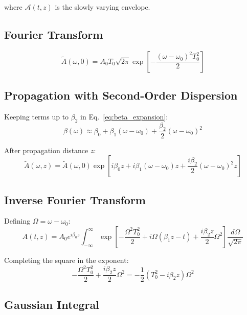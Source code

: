 \documentclass[12pt,a4paper]{article}
\begin{document}
where $\mathcal{A}(t, z)$ is the slowly varying envelope.

\subsection{Fourier Transform}

\begin{equation}
\tilde{A}(\omega, 0) = A_0 T_0 \sqrt{2\pi} \exp\left[-\frac{(\omega - \omega_0)^2 T_0^2}{2}\right]
\end{equation}

\subsection{Propagation with Second-Order Dispersion}

Keeping terms up to $\beta_2$ in Eq.~\eqref{eq:beta_expansion}:
\begin{equation}
\beta(\omega) \approx \beta_0 + \beta_1(\omega - \omega_0) + \frac{\beta_2}{2}(\omega - \omega_0)^2
\end{equation}

After propagation distance $z$:
\begin{equation}
\tilde{A}(\omega, z) = \tilde{A}(\omega, 0) \exp\left[i\beta_0 z + i\beta_1(\omega - \omega_0)z + \frac{i\beta_2}{2}(\omega - \omega_0)^2 z\right]
\end{equation}

\subsection{Inverse Fourier Transform}

Defining $\Omega = \omega - \omega_0$:
\begin{equation}
A(t, z) = A_0 e^{i\beta_0 z} \int_{-\infty}^{\infty} \exp\left[-\frac{\Omega^2 T_0^2}{2} + i\Omega(\beta_1 z - t) + \frac{i\beta_2 z}{2}\Omega^2\right] \frac{d\Omega}{\sqrt{2\pi}}
\end{equation}

Completing the square in the exponent:
\begin{equation}
-\frac{\Omega^2 T_0^2}{2} + \frac{i\beta_2 z}{2}\Omega^2 = -\frac{1}{2}\left(T_0^2 - i\beta_2 z\right)\Omega^2
\end{equation}

\subsection{Gaussian Integral}
\end{document}

